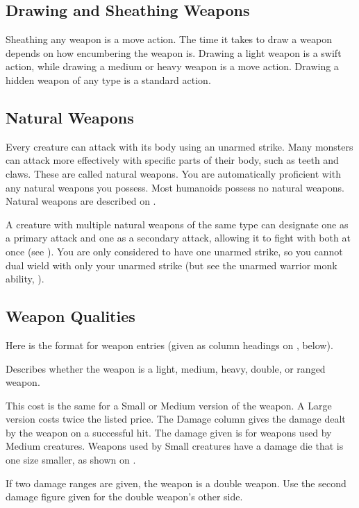 \subsection{Drawing and Sheathing Weapons}\label{Drawing and Sheathing Weapons}
Sheathing any weapon is a move action. The time it takes to draw a weapon depends on how encumbering the weapon is. Drawing a light weapon is a swift action, while drawing a medium or heavy weapon is a move action. Drawing a hidden weapon of any type is a standard action.

\subsection{Natural Weapons}\label{Natural Weapons}
Every creature can attack with its body using an unarmed strike. Many monsters can attack more effectively with specific parts of their body, such as teeth and claws. These are called natural weapons. You are automatically proficient with any natural weapons you possess. Most humanoids possess no natural weapons. Natural weapons are described on .

A creature with multiple natural weapons of the same type can designate one as a primary attack and one as a secondary attack, allowing it to fight with both at once (see ). You are only considered to have one unarmed strike, so you cannot dual wield with only your unarmed strike (but see the unarmed warrior monk ability, ).

\subsection{Weapon Qualities}
Here is the format for weapon entries (given as column headings on , below).

 Describes whether the weapon is a light, medium, heavy, double, or ranged weapon.

\par This cost is the same for a Small or Medium version of the weapon. A Large version costs twice the listed price.
 The Damage column gives the damage dealt by the weapon on a successful hit. The damage given is for weapons used by Medium creatures. Weapons used by Small creatures have a damage die that is one size smaller, as shown on .

If two damage ranges are given, the weapon is a double weapon. Use the second damage figure given for the double weapon's other side.

